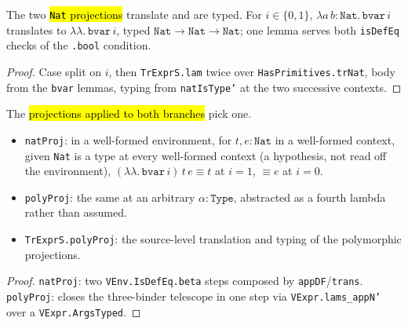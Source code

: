 \begin{lemma}
  \label{prim-cond:thm:trexprs-natproj}
  \leanok

   The two \hl{\texttt{Nat} projections} translate and are typed.
  For $i \in \{0,1\}$, $\lambda a\,b : \mathtt{Nat}.\,\mathtt{bvar}\,i$ translates to $\lambda\lambda.\,\mathtt{bvar}\,i$, typed $\mathtt{Nat} \to \mathtt{Nat} \to \mathtt{Nat}$; one lemma serves
  both \texttt{isDefEq} checks of the \texttt{.bool} condition.
\end{lemma}
\begin{proof}
  \leanok
   Case split on $i$, then \texttt{TrExprS.lam} twice over \texttt{HasPrimitives.trNat},
  body from the \texttt{bvar} lemmas, typing from \texttt{natIsType'} at the two successive
  contexts.
\end{proof}

\begin{lemma}
  \label{prim-cond:thm:isdefequ-natproj}
  \leanok

   The \hl{projections applied to both branches} pick one.
  \begin{itemize}
  \item \texttt{natProj}: in a well-formed environment, for $t, e : \mathtt{Nat}$ in a well-formed
    context, given \texttt{Nat} is a type at every well-formed context (a hypothesis, not read off
    the environment), $(\lambda\lambda.\,\mathtt{bvar}\,i)\,t\,e \equiv t$ at $i=1$, $\equiv e$ at
    $i=0$.
  \item \texttt{polyProj}: the same at an arbitrary $\alpha : \mathtt{Type}$, abstracted as a fourth
    lambda rather than assumed.
  \item \texttt{TrExprS.polyProj}: the source-level translation and typing of the polymorphic
    projections.
  \end{itemize}
\end{lemma}
\begin{proof}
  \leanok
   \texttt{natProj}: two \texttt{VEnv.IsDefEq.beta} steps composed by
  \texttt{appDF}/\texttt{trans}. \texttt{polyProj}: closes the three-binder telescope in one step
  via \texttt{VExpr.lams\_appN'} over a \texttt{VExpr.ArgsTyped}.
\end{proof}

